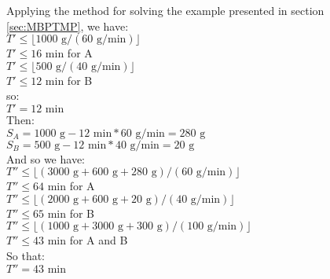 \documentclass[authoryear,preprint,12pt]{elsarticle}
\begin{document}
Applying the method for solving the example presented in section \ref{sec:MBPTMP}, we have: \\

$T' \leq \lfloor{1000 \textrm{ g} / (60 \textrm{ g}/\textrm{min})}\rfloor$ \\

$T' \leq 16 \textrm{ min}$ \quad for A \\

$T' \leq \lfloor{500 \textrm{ g} / (40 \textrm{ g}/\textrm{min})}\rfloor$ \\

$T' \leq 12 \textrm{ min}$ \quad for B \\

so: \\

$T' = 12 \textrm{ min}$ \\

Then:\\

$S_A = 1000 \textrm{ g} - 12 \textrm{ min} * 60 \textrm{ g}/\textrm{min} = 280 \textrm{ g}$ \\

$S_B = 500 \textrm{ g} - 12 \textrm{ min} * 40 \textrm{ g}/\textrm{min} = 20 \textrm{ g}$ \\

And so we have: \\

$T'' \leq \lfloor{(3000 \textrm{ g} + 600 \textrm{ g} + 280 \textrm{ g}) / (60 \textrm{ g}/\textrm{min})}\rfloor$ \\

$T'' \leq 64 \textrm{ min}$ \quad for A \\

$T'' \leq \lfloor{(2000 \textrm{ g} + 600 \textrm{ g} + 20 \textrm{ g}) / (40 \textrm{ g}/\textrm{min})}\rfloor$ \\

$T'' \leq 65 \textrm{ min}$ \quad for B \\

$T'' \leq \lfloor{(1000 \textrm{ g} + 3000 \textrm{ g} + 300 \textrm{ g}) / (100 \textrm{ g}/\textrm{min})}\rfloor$ \\

$T'' \leq 43 \textrm{ min}$ \quad for A and B \\

So that: \\

$T'' = 43 \textrm{ min}$ \\
\end{document}
